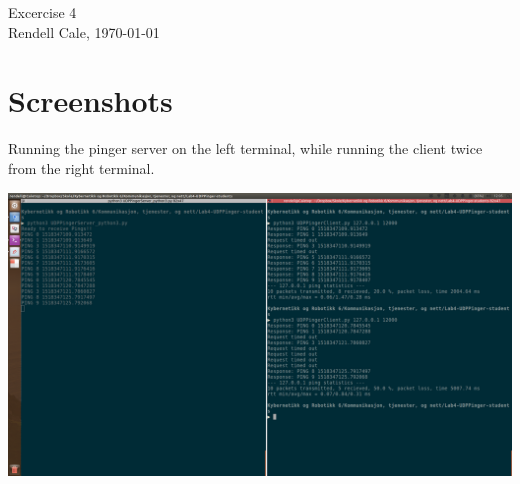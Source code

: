 \documentclass{article}
\begin{document}
Excercise 4 \\
Rendell Cale, \today 

\section*{Screenshots}
Running the pinger server on the left terminal, while running the client twice from the right terminal.
\begin{centering}
	\center
	\includegraphics[width=\linewidth]{udp-pinger.png}
\end{centering}
\end{document}
